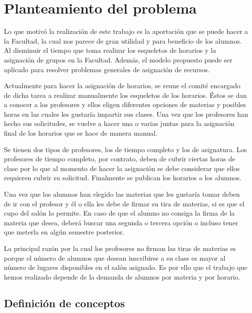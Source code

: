 \chapter{Planteamiento del problema}

Lo que motivó la realización de este trabajo es la aportación que se puede hacer a la Facultad, la cual nos parece de gran utilidad y para beneficio de los alumnos. Al disminuir el tiempo que toma realizar los esqueletos de horarios y la asignación de grupos en la Facultad. Además, el modelo propuesto puede ser aplicado para resolver problemas generales de asignación de recursos.

Actualmente para hacer la asignación de horarios, se reune el comité encargado de dicha tarea a realizar manualmente los esqueletos de los horarios. Éstos se dan a conocer a los profesores y ellos eligen diferentes opciones de materias y posibles horas en las cuales les gustaría impartir sus clases. Una vez que los profesores han hecho sus solicitudes, se vuelve a hacer una o varias juntas para la asignación final de los horarios que se hace de manera manual.

Se tienen dos tipos de profesores, los de tiempo completo y los de asignatura. Los profesores de tiempo completo, por contrato, deben de cubrir ciertas horas de clase por lo que al momento de hacer la asignación se debe considerar que ellos requieren cubrir su solicitud. Finalmente se publican los horarios a los alumnos.

Una vez que los alumnos han elegido las materias que les gustaría tomar deben de ir con el profesor y él o ella les debe de firmar su tira de materias, si es que el cupo del salón lo permite. En caso de que el alumno no consiga la firma de la materia que desea, deberá buscar una segunda o tercera opción o incluso tener que meterla en algún semestre posterior.

La principal razón por la cual los profesores no firman las tiras de materias es porque el número de alumnos que desean inscribirse a su clase es mayor al número de lugares disponibles en el salón asignado. Es por ello que el trabajo que hemos realizado depende de la demanda de alumnos por materia y por horario.



\section{Definición de conceptos}

